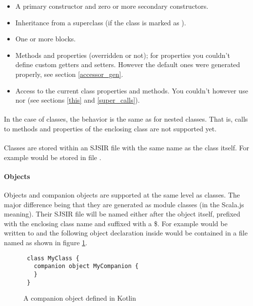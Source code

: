 \begin{itemize}
 \item A primary constructor and zero or more secondary constructors.
 \item Inheritance from a superclass (if the class is marked as ).
 \item One or more  blocks.
 \item Methods and properties (overridden or not); for properties you couldn't define custom 
getters and setters. However the default ones were generated properly, see section 
\ref{accessor_gen}.
 \item Access to the current class properties and methods. You couldn't however use 
 nor  (see sections \ref{this} and \ref{super_calls}).
\end{itemize}

\paragraph{} In the case of  classes, the behavior is the same as for nested 
classes. That is, calls to methods and properties of the enclosing class are not supported yet.

\paragraph{} Classes are stored within an SJSIR file with the same name as the class itself. For 
example  would be stored in file .

\paragraph{Objects} \label{objects}Objects and companion objects are supported at the same level as 
classes. The major difference being that they are generated as module classes (in the Scala.js 
meaning). Their SJSIR file will be named either after the object itself, prefixed with the enclosing 
class name and suffixed with a \$. For example  would be written to 
 and the following object declaration inside  would 
be contained in a file named  as shown in figure 
\ref{companion_example}.

\begin{figure}[h]
\begin{verbatim}
 class MyClass {
   companion object MyCompanion {
   }
 }
\end{verbatim}
  \caption{A companion object defined in Kotlin}
  \label{companion_example}
\end{figure}

